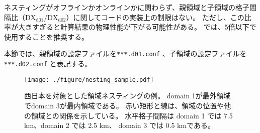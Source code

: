 ネスティングがオフラインかオンラインかに関わらず、親領域と子領域の格子間隔比（$\mathrm{DX}_{\mathrm{d01}}/\mathrm{DX}_{\mathrm{d02}}$）に関してコードの実装上の制限はない。
ただし、この比率が大きすぎると計算結果の物理性能が下がる可能性がある。
\scalerm では、5倍以下で使用することを推奨する。

本節では、親領域の設定ファイルを\verb|***.d01.conf| 、子領域の設定ファイルを\verb|***.d02.conf| と表記する。

\begin{figure}[t]
\begin{center}
  \texttt{[image: ./figure/nesting\_sample.pdf]}\\
  \caption{西日本を対象とした領域ネスティングの例。
    domain 1が最外領域でdomain 3が最内領域である。
    赤い矩形と線は、領域の位置や他の領域との関係を示している。
    水平格子間隔は domain 1 では 7.5 km、domain 2 では 2.5 km、
    domain 3 では 0.5 kmである。}
  \label{fig_nestsample}
\end{center}
\end{figure}
